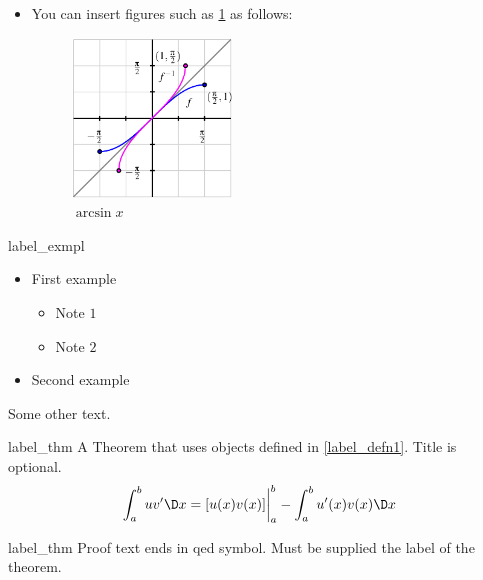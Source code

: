 \documentclass{worksheet}
\begin{document}
\begin{itemize}
    \item 
    You can insert figures such as \cref{fig:arcsin} as follows:
    \begin{figure}[!ht] %
        \centering
        \includegraphics[width=0.4\textwidth]{images/picture.png}
        \caption{$\arcsin x$}
        \label{fig:arcsin}
    \end{figure}
    
    \end{itemize}
   
	
	
	
	\begin{exmpl}[Title]{label_exmpl}
	 \begin{itemize}
        \item First example 
        \begin{itemize}
            \item  Note $1$
            \item  Note $2$
        \end{itemize}
        \item Second example
    \end{itemize}
	\end{exmpl}    


    
	Some other text.
	
	\begin{theo}{label_thm}
	A Theorem that uses objects defined in \cref{label_defn1}. Title is optional. 
	\[\dint_a^b u v' \dx = [u(x)v(x)] \eval_a^b - \dint_a^b u'(x) v(x) \dx\]
	\end{theo}
	
    
    \begin{prf}{label_thm}
    Proof text ends in qed symbol. Must be supplied the label of the theorem.
    \end{prf}
    
\end{document}
